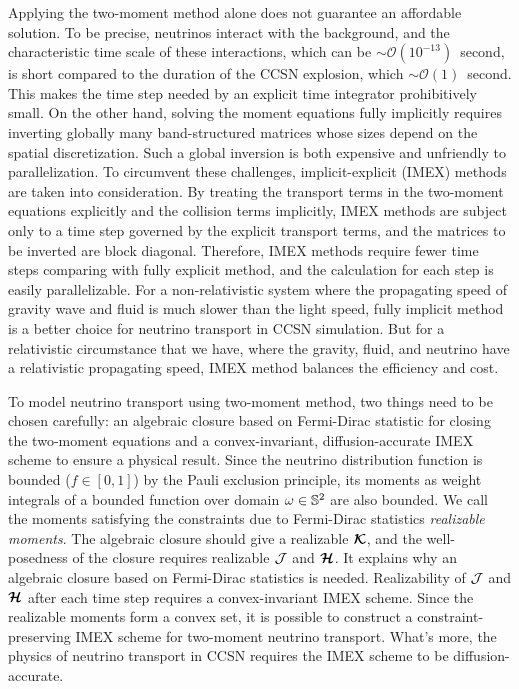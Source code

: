 Applying the two-moment method alone does not guarantee an affordable solution.
To be precise, neutrinos interact with the background, and the characteristic time scale of these interactions, which can be $\sim\mathcal{O}(10^{-13})$~second, is short compared to the duration of the CCSN explosion, which $\sim\mathcal{O}(1)$~second.  
This makes the time step needed by an explicit time integrator prohibitively small. 
On the other hand, solving the moment equations fully implicitly requires inverting globally many band-structured matrices whose sizes depend on the spatial discretization.
Such a global inversion is both expensive and unfriendly to parallelization.
To circumvent these challenges, implicit-explicit (IMEX) methods are taken into consideration.
By treating the transport terms in the two-moment equations explicitly and the collision terms implicitly, IMEX methods are subject only to a time step governed by the explicit transport terms, and the matrices to be inverted are block diagonal.
Therefore, IMEX methods require fewer time steps comparing with fully explicit method, and the calculation for each step is easily parallelizable.  
For a non-relativistic system where the propagating speed of gravity wave and fluid is much slower than the light speed, fully implicit method is a better choice for neutrino transport in CCSN simulation.\rc{[references]}
But for a relativistic circumstance that we have, where the gravity, fluid, and neutrino have a relativistic propagating speed, IMEX method
balances the efficiency and cost.

To model neutrino transport using two-moment method, two things need to be chosen carefully: an algebraic closure based on Fermi-Dirac statistic for closing the two-moment equations and a convex-invariant, diffusion-accurate IMEX scheme to ensure a physical result.
Since the neutrino distribution function is bounded ($f\in[0,1]$) by the Pauli exclusion principle, its moments as weight integrals of a bounded function over domain $\omega\in\mathbb{S}^{2}$ are also bounded.
We call the moments satisfying the constraints due to Fermi-Dirac statistics \textit{realizable moments}.
The algebraic closure should give a realizable $\boldsymbol{\mathcal{K}}$, and the well-posedness of the closure requires realizable $\mathcal{J}$ and $\boldsymbol{\mathcal{H}}$.
It explains why an algebraic closure based on Fermi-Dirac statistics is needed.
Realizability of $\mathcal{J}$ and $\boldsymbol{\mathcal{H}}$ after each time step requires a convex-invariant IMEX scheme.
Since the realizable moments form a convex set, it is possible to construct a constraint-preserving IMEX scheme for two-moment neutrino transport.
What's more, the physics of neutrino transport in CCSN requires the IMEX scheme to be diffusion-accurate.

